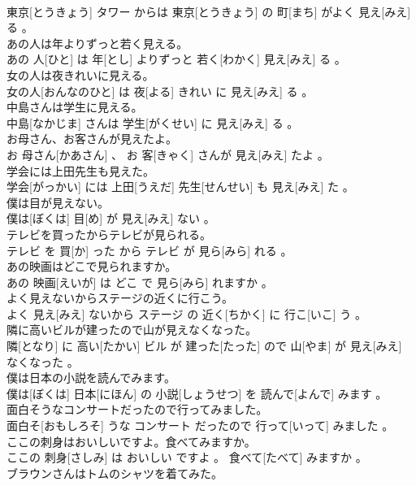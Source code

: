 \documentclass[8pt]{extreport}
\begin{document}
\begin{CJK}{UTF8}{min}
\\	東京[とうきょう] タワー からは 東京[とうきょう] の 町[まち] がよく 見え[みえ] る 。
\\	あの人は年よりずっと若く見える。	
\\	あの 人[ひと] は 年[とし] よりずっと 若く[わかく] 見え[みえ] る 。
\\	女の人は夜きれいに見える。	
\\	女の人[おんなのひと] は 夜[よる] きれい に 見え[みえ] る 。
\\	中島さんは学生に見える。	
\\	中島[なかじま] さんは 学生[がくせい] に 見え[みえ] る 。
\\	お母さん、お客さんが見えたよ。	
\\	お 母さん[かあさん] 、 お 客[きゃく] さんが 見え[みえ] たよ 。
\\	学会には上田先生も見えた。	
\\	学会[がっかい] には 上田[うえだ] 先生[せんせい] も 見え[みえ] た 。
\\	僕は目が見えない。	
\\	僕は[ぼくは] 目[め] が 見え[みえ] ない 。
\\	テレビを買ったからテレビが見られる。	
\\	テレビ を 買[か] った から テレビ が 見ら[みら] れる 。
\\	あの映画はどこで見られますか。	
\\	あの 映画[えいが] は どこ で 見ら[みら] れますか 。
\\	よく見えないからステージの近くに行こう。	
\\	よく 見え[みえ] ないから ステージ の 近く[ちかく] に 行こ[いこ] う 。
\\	隣に高いビルが建ったので山が見えなくなった。	
\\	隣[となり] に 高い[たかい] ビル が 建った[たった] ので 山[やま] が 見え[みえ] なくなった 。
\\	僕は日本の小説を読んでみます。	
\\	僕は[ぼくは] 日本[にほん] の 小説[しょうせつ] を 読んで[よんで] みます 。
\\	面白そうなコンサートだったので行ってみました。	
\\	面白そ[おもしろそ] うな コンサート だったので 行って[いって] みました 。
\\	ここの刺身はおいしいですよ。食べてみますか。	
\\	ここの 刺身[さしみ] は おいしい ですよ 。 食べて[たべて] みますか 。
\\	ブラウンさんはトムのシャツを着てみた。	

\end{CJK}
\end{document}
